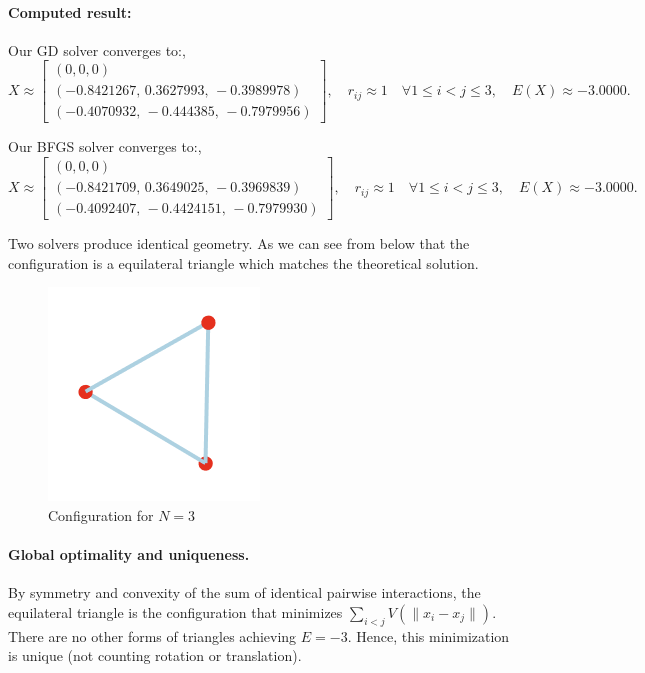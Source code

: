 \documentclass[11pt,onecolumn]{article}
\begin{document}
\paragraph{Computed result:}  
Our GD solver converges to:,
\[
  X \approx
  \begin{bmatrix}
    (0,0,0) \\[3pt]
    (-0.8421267,\,0.3627993,\,-0.3989978) \\[3pt]
    (-0.4070932,\,-0.444385,\,-0.7979956)
  \end{bmatrix}, \quad
  r_{ij} \approx 1 \quad \forall 1\leq i<j \leq3,
  \quad
  E(X) \approx -3.0000.
\]

Our BFGS solver converges to:,
\[
  X \approx
  \begin{bmatrix}
    (0,0,0) \\[3pt]
    (-0.8421709,\,0.3649025,\,-0.3969839) \\[3pt]
    (-0.4092407,\,-0.4424151,\,-0.7979930)
  \end{bmatrix}, \quad
  r_{ij} \approx 1 \quad \forall 1\leq i<j \leq3,
  \quad
  E(X) \approx -3.0000.
\]

Two solvers produce identical geometry. As we can see from below that the configuration is a equilateral triangle which matches the theoretical solution.
\begin{figure}[h]
  \centering
  \includegraphics[width=0.5\textwidth]{N3.png}
  \caption{Configuration for $N=3$}
\end{figure}

\paragraph{Global optimality and uniqueness.}  
By symmetry and convexity of the sum of identical pairwise interactions, the equilateral triangle is the configuration that minimizes \(\sum_{i<j}V(\|x_i-x_j\|)\).  There are no other forms of triangles achieving \(E=-3\).  Hence, this minimization is unique (not counting rotation or translation).
\end{document}
